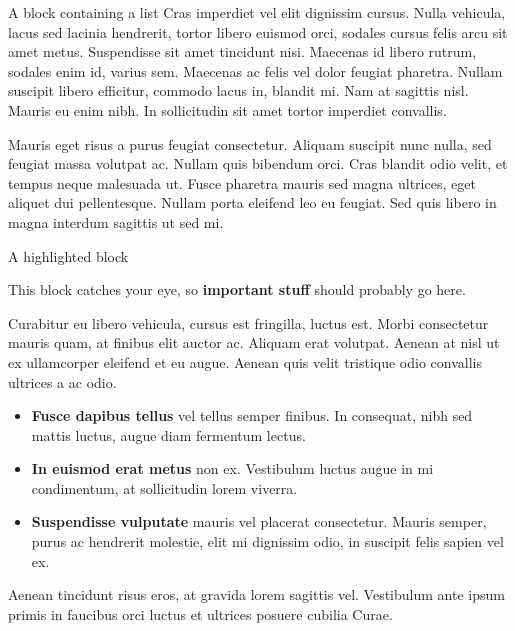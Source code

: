 \documentclass[final]{beamer}
\newlength{\colwidth}
\begin{document}
\begin{frame}[t]
\begin{columns}[t]
\begin{column}{\colwidth}
\begin{block}{A block containing a list}
    Cras imperdiet vel elit dignissim cursus. Nulla vehicula, lacus sed lacinia
    hendrerit, tortor libero euismod orci, sodales cursus felis arcu sit amet
    metus. Suspendisse sit amet tincidunt nisi. Maecenas id libero rutrum,
    sodales enim id, varius sem. Maecenas ac felis vel dolor feugiat pharetra.
    Nullam suscipit libero efficitur, commodo lacus in, blandit mi. Nam at
    sagittis nisl. Mauris eu enim nibh. In sollicitudin sit amet tortor
    imperdiet convallis.

    Mauris eget risus a purus feugiat consectetur. Aliquam suscipit nunc
    nulla, sed feugiat massa volutpat ac. Nullam quis bibendum orci. Cras
    blandit odio velit, et tempus neque malesuada ut. Fusce pharetra mauris
    sed magna ultrices, eget aliquet dui pellentesque. Nullam porta eleifend
    leo eu feugiat. Sed quis libero in magna interdum sagittis ut sed mi.

  \end{block}

  \begin{alertblock}{A highlighted block}

    This block catches your eye, so \textbf{important stuff} should probably go
    here.

    Curabitur eu libero vehicula, cursus est fringilla, luctus est. Morbi
    consectetur mauris quam, at finibus elit auctor ac. Aliquam erat volutpat.
    Aenean at nisl ut ex ullamcorper eleifend et eu augue. Aenean quis velit
    tristique odio convallis ultrices a ac odio.

    \begin{itemize}
      \item \textbf{Fusce dapibus tellus} vel tellus semper finibus. In
        consequat, nibh sed mattis luctus, augue diam fermentum lectus.
      \item \textbf{In euismod erat metus} non ex. Vestibulum luctus augue in
        mi condimentum, at sollicitudin lorem viverra.
      \item \textbf{Suspendisse vulputate} mauris vel placerat consectetur.
        Mauris semper, purus ac hendrerit molestie, elit mi dignissim odio, in
        suscipit felis sapien vel ex.
    \end{itemize}

    Aenean tincidunt risus eros, at gravida lorem sagittis vel. Vestibulum ante
    ipsum primis in faucibus orci luctus et ultrices posuere cubilia Curae.

  \end{alertblock}


\end{column}
\end{columns}
\end{frame}
\end{document}
